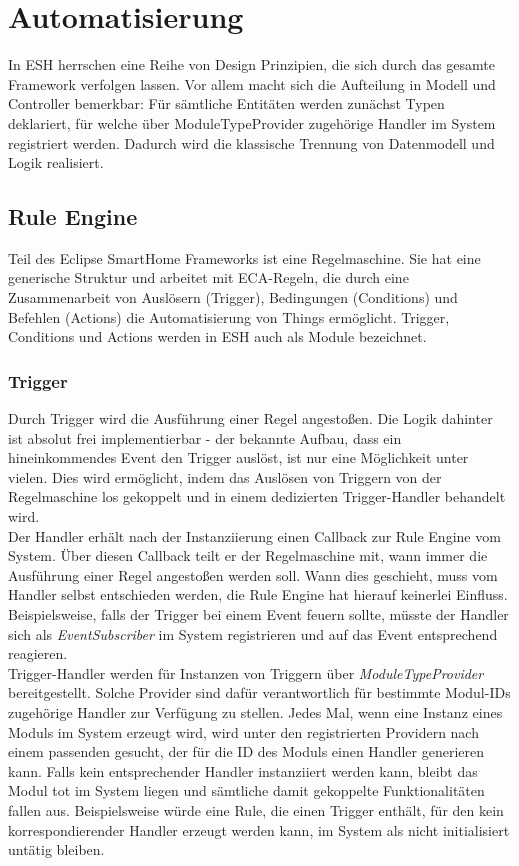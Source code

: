 \section{Automatisierung}
In ESH herrschen eine Reihe von Design Prinzipien, die sich durch das gesamte Framework verfolgen lassen. Vor allem macht sich die Aufteilung in Modell und Controller bemerkbar: Für sämtliche Entitäten werden zunächst Typen deklariert, für welche über ModuleTypeProvider zugehörige Handler im System registriert werden. Dadurch wird die klassische Trennung von Datenmodell und Logik realisiert.

\subsection{Rule Engine}
\label{sec:ruleengine}
Teil des Eclipse SmartHome Frameworks ist eine Regelmaschine. Sie hat eine generische Struktur und arbeitet mit ECA-Regeln, die durch eine Zusammenarbeit von Auslösern (Trigger), Bedingungen (Conditions) und Befehlen (Actions) die Automatisierung von Things ermöglicht. Trigger, Conditions und Actions werden in ESH auch als Module bezeichnet.


\subsubsection{Trigger}
Durch Trigger wird die Ausführung einer Regel angestoßen. Die Logik dahinter ist absolut frei implementierbar - der bekannte Aufbau, dass ein hineinkommendes Event den Trigger auslöst, ist nur eine Möglichkeit unter vielen. Dies wird ermöglicht, indem das Auslösen von Triggern von der Regelmaschine los gekoppelt und in einem dedizierten Trigger-Handler behandelt wird. \\

Der Handler erhält nach der Instanziierung einen Callback zur Rule Engine vom System. Über diesen Callback teilt er der Regelmaschine mit, wann immer die Ausführung einer Regel angestoßen werden soll. Wann dies geschieht, muss vom Handler selbst entschieden werden, die Rule Engine hat hierauf keinerlei Einfluss. Beispielsweise, falls der Trigger bei einem Event feuern sollte, müsste der Handler sich als \textit{EventSubscriber} im System registrieren und auf das Event entsprechend reagieren.\\

Trigger-Handler werden für Instanzen von Triggern über \textit{ModuleTypeProvider} bereitgestellt. Solche Provider sind dafür verantwortlich für bestimmte Modul-IDs zugehörige Handler zur Verfügung zu stellen. Jedes Mal, wenn eine Instanz eines Moduls im System erzeugt wird, wird unter den registrierten Providern nach einem passenden gesucht, der für die ID des Moduls einen Handler generieren kann. Falls kein entsprechender Handler instanziiert werden kann, bleibt das Modul tot im System liegen und sämtliche damit gekoppelte Funktionalitäten fallen aus. Beispielsweise würde eine Rule, die einen Trigger enthält, für den kein korrespondierender Handler erzeugt werden kann, im System als \glqq nicht initialisiert\grqq{} untätig bleiben.

